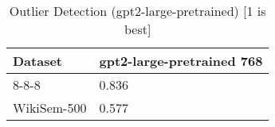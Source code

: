 \begin{table}[]
\centering
\begin{tabular}{l|l}
\hline
Dataset & gpt2-large-pretrained 768 \\
\hline
8-8-8 & 0.836 \\ 
WikiSem-500 & 0.577
\end{tabular}
\caption{Outlier Detection (gpt2-large-pretrained) [1 is best]}
\label{tab:outlier-gpt2-large-pretrained}
\end{table}
